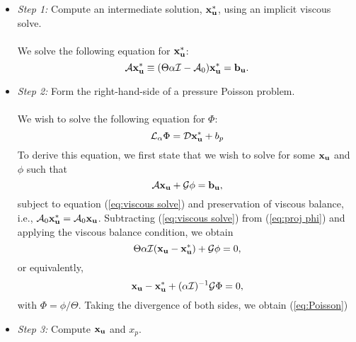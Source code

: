 \documentclass[final]{siamltex}
\def\bb {{\bf b}}
\def\ub {{\bf u}}
\def\xb {{\bf x}}
\begin{document}
\begin{itemize}
\item {\it Step 1:} Compute an intermediate solution, $\xb_{\ub}^*$, using an implicit viscous solve.\\ \\
We solve the following equation for $\xb_{\ub}^*$:
\begin{equation}
\mathcal{A} \xb_{\ub}^* \equiv (\Theta\alpha\mathcal{I} - \mathcal{A}_0)\xb_{\ub}^* = \bb_{\ub}.\label{eq:viscous solve}
\end{equation}

\item {\it Step 2:} Form the right-hand-side of a pressure Poisson problem.\\ \\
We wish to solve the following equation for $\Phi$:
\begin{equation}
\mathcal{L}_\alpha\Phi = \mathcal{D}\xb_\ub^* + b_p\label{eq:Poisson}
\end{equation}
To derive this equation, we first state that
we wish to solve for some $\xb_\ub$ and $\phi$ such that
\begin{equation}
\mathcal{A}\xb_\ub + \mathcal{G}\phi = \bb_\ub,\label{eq:proj phi}
\end{equation}
subject to equation (\ref{eq:viscous solve}) and preservation of viscous balance,
i.e., $\mathcal{A}_0\xb_\ub^* = \mathcal{A}_0\xb_\ub$.
Subtracting (\ref{eq:viscous solve}) from (\ref{eq:proj phi}) and applying
the viscous balance condition, we obtain
\begin{equation}
\Theta\alpha\mathcal{I}(\xb_\ub-\xb_\ub^*) + \mathcal{G}\phi = 0,
\end{equation}
or equivalently,
\begin{equation}
\xb_\ub-\xb_\ub^* + (\alpha\mathcal{I})^{-1}\mathcal{G}\Phi = 0,\label{eq:proj phi 2}
\end{equation}
with $\Phi = \phi/\Theta$.  Taking the divergence of both sides, we obtain (\ref{eq:Poisson})\\

\item {\it Step 3:} Compute $\xb_\ub$ and $x_p$.\\


\end{itemize}
\end{document}
